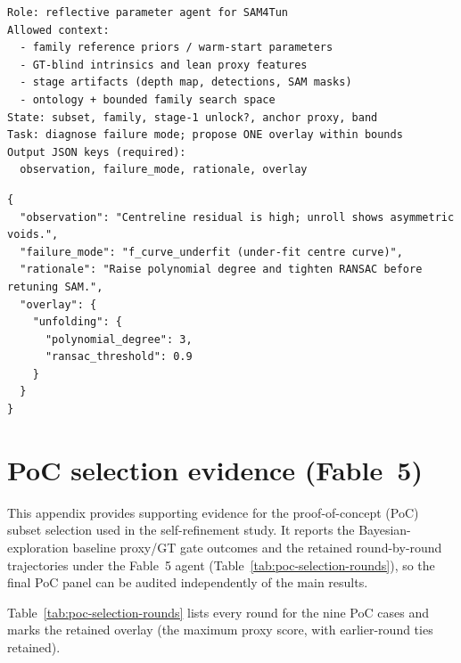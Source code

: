 \documentclass[a4paper,fleqn]{cas-dc}
\begin{document}
{\begin{lstlisting}[caption={Concentrated agent-prompt skeleton (per round).},label={lst:prompt-skeleton}]
Role: reflective parameter agent for SAM4Tun
Allowed context:
  - family reference priors / warm-start parameters
  - GT-blind intrinsics and lean proxy features
  - stage artifacts (depth map, detections, SAM masks)
  - ontology + bounded family search space
State: subset, family, stage-1 unlock?, anchor proxy, band
Task: diagnose failure mode; propose ONE overlay within bounds
Output JSON keys (required):
  observation, failure_mode, rationale, overlay
\end{lstlisting}

\begin{lstlisting}[caption={Example JSON proposal returned by the agent.},label={lst:prompt-example}]
{
  "observation": "Centreline residual is high; unroll shows asymmetric voids.",
  "failure_mode": "f_curve_underfit (under-fit centre curve)",
  "rationale": "Raise polynomial degree and tighten RANSAC before retuning SAM.",
  "overlay": {
    "unfolding": {
      "polynomial_degree": 3,
      "ransac_threshold": 0.9
    }
  }
}
\end{lstlisting}

\section{PoC selection evidence (Fable~5)}\label{app:poc-selection}

This appendix provides supporting evidence for the proof-of-concept (PoC) subset selection used in the self-refinement study. It reports the Bayesian-exploration baseline proxy/GT gate outcomes and the retained round-by-round trajectories under the Fable~5 agent (Table~\ref{tab:poc-selection-rounds}), so the final PoC panel can be audited independently of the main results.

Table~\ref{tab:poc-selection-rounds} lists every round for the nine PoC cases and marks the retained overlay (the maximum proxy score, with earlier-round ties retained).

}
\end{document}

